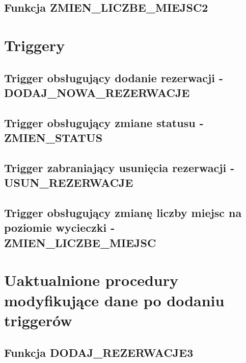 \documentclass[a4paper, 11pt]{article}
\begin{document}
    \newpage

    \subsection{Funkcja ZMIEN\_LICZBE\_MIEJSC2}
    

    \newpage

    \section{Triggery}

    \subsection{Trigger obsługujący dodanie rezerwacji - DODAJ\_NOWA\_REZERWACJE}
    

    \subsection{Trigger obsługujący zmiane statusu - ZMIEN\_STATUS}
    

    \newpage

    \subsection{Trigger zabraniający usunięcia rezerwacji - USUN\_REZERWACJE}
    

    \subsection{Trigger obsługujący zmianę liczby miejsc
    \newline na poziomie wycieczki - ZMIEN\_LICZBE\_MIEJSC}
    


    \section{Uaktualnione procedury modyfikujące dane po dodaniu triggerów}

    \subsection{Funkcja DODAJ\_REZERWACJE3}
    
\end{document}
